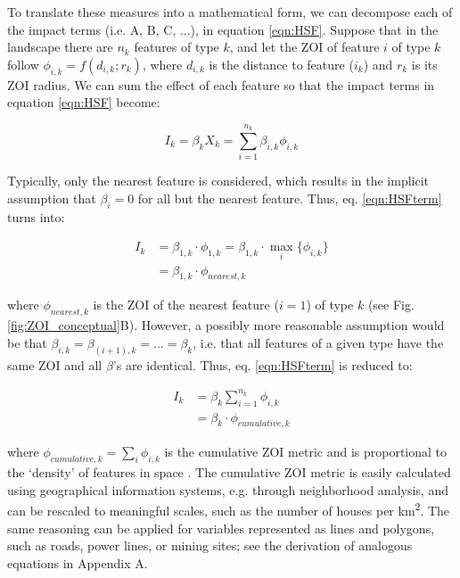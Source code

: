 \documentclass[titlepage]{article}
\begin{document}
To translate these measures into a mathematical form, we can decompose each of the impact terms (i.e. A, B, C, ...), in equation \ref{eqn:HSF}. Suppose that in the landscape there are $n_k$ features of type $k$, and let the ZOI of feature $i$ of type $k$ follow $\phi_{i,k} = f(d_{i,k}; r_k)$, where $d_{i,k}$ is the distance to feature ($i_k$) and $r_k$ is its ZOI radius. We can sum the effect of each feature so that the impact terms in equation \ref{eqn:HSF} become:

\begin{equation}
\label{eqn:HSFterm}
    I_k = \beta_k X_k = \sum_{i=1}^{n_k} \beta_{i,k} \phi_{i,k}
\end{equation}

Typically, only the nearest feature is considered, which results in the implicit assumption that $\beta_i = 0$ for all but the nearest feature. Thus, eq. \ref{eqn:HSFterm} turns into:

\begin{equation}
\label{eqn:HSFnearest}
\begin{split}
    I_k & = \beta_{1,k} \cdot \phi_{1,k} = \beta_{1,k} \cdot \max_{i}\{\phi_{i,k}\} \\
        & = \beta_{1,k} \cdot \phi_{nearest,k} 
\end{split}                
\end{equation}

where $\phi_{nearest,k}$ is the ZOI of the nearest feature ($i = 1$) of type $k$ (see Fig. \ref{fig:ZOI_conceptual}B). However, a possibly more reasonable assumption would be that $\beta_{i,k} = \beta_{{(i+1)},k} = ... = \beta_k$, i.e. that all features of a given type have the same ZOI and all $\beta$'s are identical. Thus, eq. \ref{eqn:HSFterm} is reduced to:

\begin{equation}
\label{eqn:HSFcuminf}
\begin{split}
    I_k & = \beta_k \sum_{i=1}^{n_k} \phi_{i,k} \\
        & = \beta_k \cdot \phi_{cumulative,k}
\end{split}
\end{equation}

where $\phi_{cumulative,k} = \sum_{i} \phi_{i,k}$ is the cumulative ZOI metric and is proportional to 
the `density' of features in space \citep[e.g.][]{panzacchi_searching_2015}. The cumulative ZOI metric is easily calculated using geographical information systems, e.g. through neighborhood analysis, and can be rescaled to meaningful scales, such as the number of houses per km\textsuperscript{2}. The same reasoning can be applied for variables represented as lines and polygons, such as roads, power lines, or mining sites; see the derivation of analogous equations in Appendix A.
\end{document}
